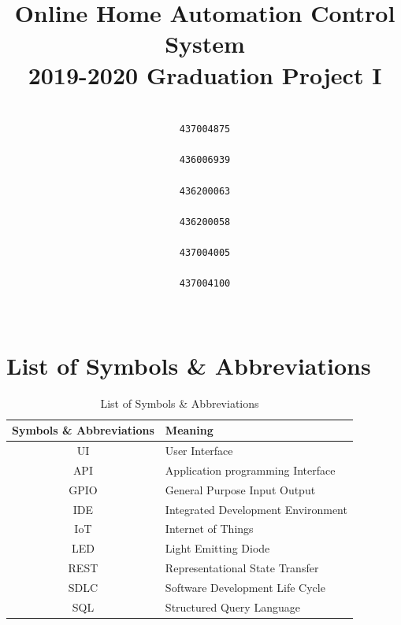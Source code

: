 \documentclass[12pt, oneside, a4paper]{book}
\date{}
\title{
	\color{chapter}
	Online Home Automation Control System \\
	\color{black}\large 2019-2020 Graduation Project I}
\author{
	\setcode{utf8}
	\RL{ريم علي الغامدي} 
	\\\texttt{437004875}
	\\[3ex]
	\RL{ساره خالد آل حسين} 
	\\\texttt{436006939}
	\\[3ex]
	\RL{ضحى نضال الزعبي} 
	\\\texttt{436200063}
	\\[3ex]
	\RL{عبير أحمد عزت} 
	\\\texttt{436200058}
	\\[3ex]
	\RL{منى سعود الخثلان} 
	\\\texttt{437004005}
	\\[3ex]
	\RL{نوف عبد الله الدعجاني} 
	\\\texttt{437004100}
	\\	\\
	\Large\RL{د. عبير محمود} 
}
\newcommand\boldcolor[1]{\textcolor{bold}{\textbf{#1}}}
\begin{document}
	
	
	\maketitle
	\newpage

	
	\tableofcontents
	\newpage	
	\doublespacing
	\newpage
	
	\listoftables
	\newpage
	
	\listoffigures
	\newpage
	

	
	\chapter*{List of Symbols \& Abbreviations}
	\label{sec:sym}
	\def\arraystretch{1.5}
	\begin{table}[H]
		\caption{List of Symbols \& Abbreviations}
		\begin{center}
			\begin{tabularx}{\linewidth}{|c|X|}\hline
				
				\boldcolor{Symbols \& Abbreviations} & \boldcolor{Meaning} \\\hline
				UI & User Interface\\\hline
				API & Application programming Interface\\\hline
				GPIO & General Purpose Input Output\\\hline
				IDE & Integrated Development Environment \\\hline
				IoT & Internet of Things \\\hline
				LED & Light Emitting Diode\\\hline
				REST & Representational State Transfer\\\hline
				SDLC & Software Development Life Cycle\\\hline
				SQL & Structured Query Language\\\hline
			\end{tabularx}
		\end{center}
	\end{table}
\end{document}
